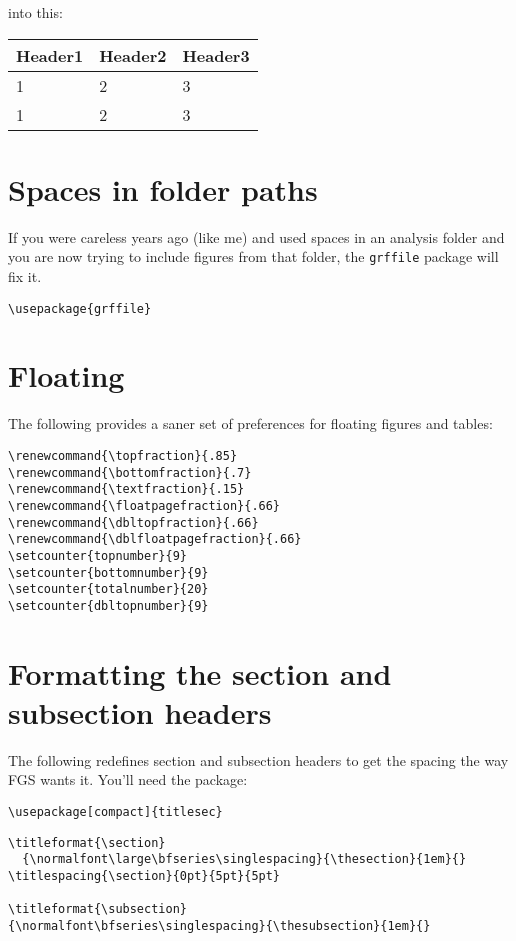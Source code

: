 \documentclass[12pt]{article}
\begin{document}
into this:

\bigskip
\begin{tabular}{lll}
\toprule
Header1 & Header2 & Header3\\
\midrule
1 & 2 & 3\\
1 & 2 & 3\\
\bottomrule
\end{tabular}
\bigskip
  
\section{Spaces in folder paths}
If you were careless years ago (like me) and used spaces in an analysis folder and you are now trying to include figures from that folder, the \verb#grffile# package will fix it.
\begin{verbatim}
\usepackage{grffile}
\end{verbatim}
 
\section{Floating}
The following provides a saner set of preferences for floating figures and tables:
\begin{verbatim}
\renewcommand{\topfraction}{.85}
\renewcommand{\bottomfraction}{.7}
\renewcommand{\textfraction}{.15}
\renewcommand{\floatpagefraction}{.66}
\renewcommand{\dbltopfraction}{.66}
\renewcommand{\dblfloatpagefraction}{.66}
\setcounter{topnumber}{9}
\setcounter{bottomnumber}{9}
\setcounter{totalnumber}{20}
\setcounter{dbltopnumber}{9}
\end{verbatim}

\section{Formatting the section and subsection headers}
The following redefines section and subsection headers to get the spacing the way FGS wants it. You'll need the package:
\begin{verbatim}
\usepackage[compact]{titlesec}
\end{verbatim}

\begin{verbatim}
\titleformat{\section}
  {\normalfont\large\bfseries\singlespacing}{\thesection}{1em}{}
\titlespacing{\section}{0pt}{5pt}{5pt}

\titleformat{\subsection}
{\normalfont\bfseries\singlespacing}{\thesubsection}{1em}{}
\end{verbatim}
\end{document}
